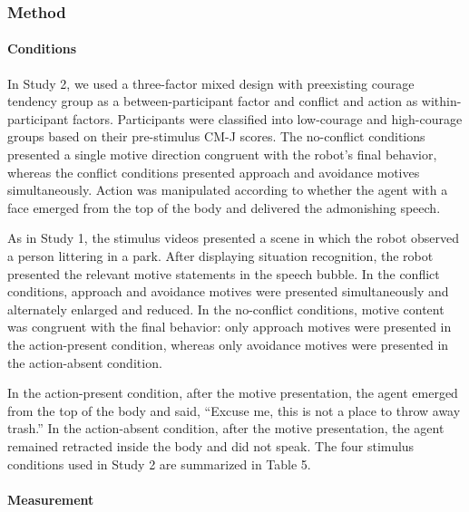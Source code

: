 \documentclass[
]{article}
\begin{document}
\subsubsection{Method}\label{method-1}

\paragraph{Conditions}\label{conditions-1}

In Study 2, we used a three-factor mixed design with preexisting courage
tendency group as a between-participant factor and conflict and action
as within-participant factors. Participants were classified into
low-courage and high-courage groups based on their pre-stimulus CM-J
scores. The no-conflict conditions presented a single motive direction
congruent with the robot's final behavior, whereas the conflict
conditions presented approach and avoidance motives simultaneously.
Action was manipulated according to whether the agent with a face
emerged from the top of the body and delivered the admonishing speech.

As in Study 1, the stimulus videos presented a scene in which the robot
observed a person littering in a park. After displaying situation
recognition, the robot presented the relevant motive statements in the
speech bubble. In the conflict conditions, approach and avoidance
motives were presented simultaneously and alternately enlarged and
reduced. In the no-conflict conditions, motive content was congruent
with the final behavior: only approach motives were presented in the
action-present condition, whereas only avoidance motives were presented
in the action-absent condition.

In the action-present condition, after the motive presentation, the
agent emerged from the top of the body and said, ``Excuse me, this is
not a place to throw away trash.'' In the action-absent condition, after
the motive presentation, the agent remained retracted inside the body
and did not speak. The four stimulus conditions used in Study 2 are
summarized in Table 5.

\paragraph{Measurement}\label{measurement-1}
\end{document}
